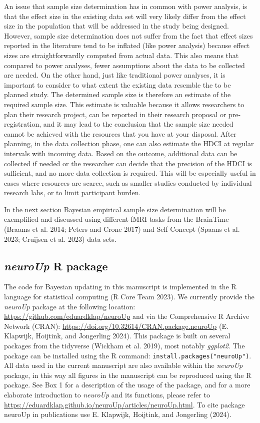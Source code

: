 \documentclass[
  letterpaper,
  DIV=11,
  numbers=noendperiod]{scrartcl}
\begin{document}
An issue that sample size determination has in common with power
analysis, is that the effect size in the existing data set will very
likely differ from the effect size in the population that will be
addressed in the study being designed. However, sample size
determination does not suffer from the fact that effect sizes reported
in the literature tend to be inflated (like power analysis) because
effect sizes are straightforwardly computed from actual data. This also
means that compared to power analyses, fewer assumptions about the data
to be collected are needed. On the other hand, just like traditional
power analyses, it is important to consider to what extent the existing
data resemble the to be planned study. The determined sample size is
therefore an estimate of the required sample size. This estimate is
valuable because it allows researchers to plan their research project,
can be reported in their research proposal or pre-registration, and it
may lead to the conclusion that the sample size needed cannot be
achieved with the resources that you have at your disposal. After
planning, in the data collection phase, one can also estimate the HDCI
at regular intervals with incoming data. Based on the outcome,
additional data can be collected if needed or the researcher can decide
that the precision of the HDCI is sufficient, and no more data
collection is required. This will be especially useful in cases where
resources are scarce, such as smaller studies conducted by individual
research labs, or to limit participant burden.

In the next section Bayesian empirical sample size determination will be
exemplified and discussed using different fMRI tasks from the BrainTime
(Braams et al. 2014; Peters and Crone 2017) and Self-Concept (Spaans et
al. 2023; Cruijsen et al. 2023) data sets.

\subsection{\texorpdfstring{\emph{neuroUp} R
package}{neuroUp R package}}\label{neuroup-r-package}

The code for Bayesian updating in this manuscript is implemented in the
R language for statistical computing (R Core Team 2023). We currently
provide the \emph{neuroUp} package at the following location:
\url{https://github.com/eduardklap/neuroUp} and via the Comprehensive R
Archive Network (CRAN):
\url{https://doi.org/10.32614/CRAN.package.neuroUp} (E. Klapwijk,
Hoijtink, and Jongerling 2024). This package is built on several
packages from the tidyverse (Wickham et al. 2019), most notably
\emph{ggplot2}. The package can be installed using the R command:
\texttt{install.packages("neuroUp")}. All data used in the current
manuscript are also available within the \emph{neuroUp} package, in this
way all figures in the manuscript can be reproduced using the R package.
See Box 1 for a description of the usage of the package, and for a more
elaborate introduction to \emph{neuroUp} and its functions, please refer
to \url{https://eduardklap.github.io/neuroUp/articles/neuroUp.html}. To
cite package neuroUp in publications use E. Klapwijk, Hoijtink, and
Jongerling (2024).
\end{document}
